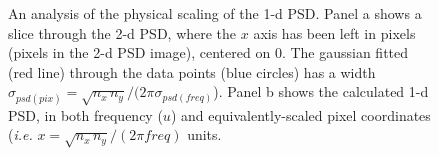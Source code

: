 \documentclass[11pt,preprint]{aastex}
\begin{document}
\begin{figure}[htpb]
\centering
{}
\caption{{\small
An analysis of the physical scaling of the 1-d PSD. Panel a shows a slice through the 2-d PSD, where the $x$ axis has been left in pixels (pixels in the 2-d PSD image), centered on 0. The gaussian fitted (red line) through the data points (blue circles) has a width $\sigma_{psd(pix)} = \sqrt{n_x\, n_y} / (2 \pi \sigma_{psd(freq)}$). Panel b shows the calculated 1-d PSD, in both frequency ($u$) and equivalently-scaled pixel coordinates ({\it i.e.} $x = \sqrt{n_x\,n_y} / (2 \pi freq)$ units.}}
\label{fig:gauss_psd_spatial}
\end{figure}
\end{document}
